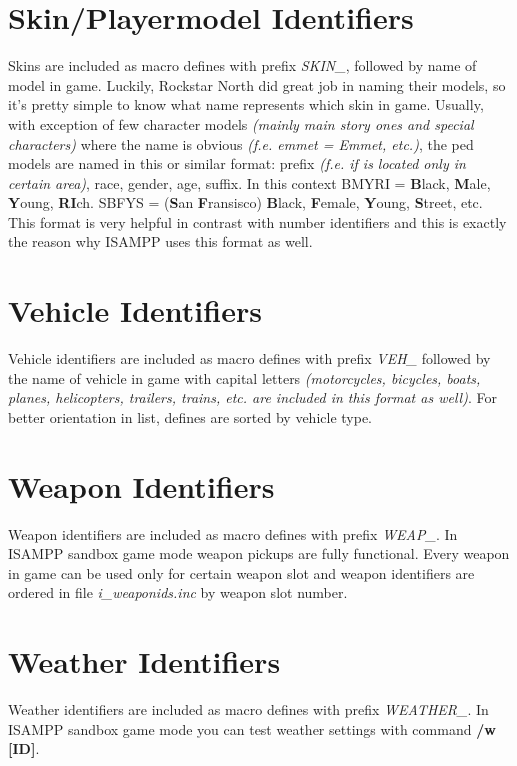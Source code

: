 \documentclass{article}
\begin{document}
\section{Skin/Playermodel Identifiers}
Skins are included as macro defines with prefix \textit{SKIN\_}, followed by name of model in game. Luckily, Rockstar North did great job in naming their models, so it's pretty simple to know what name represents which skin in game. Usually, with exception of few character models \textit{(mainly main story ones and special characters)} where the name is obvious \textit{(f.e. emmet = Emmet, etc.)}, the ped models are named in this or similar format: prefix \textit{(f.e. if is located only in certain area)}, race, gender, age, suffix. In this context BMYRI = \textbf{B}lack, \textbf{M}ale, \textbf{Y}oung, \textbf{RI}ch. SBFYS = (\textbf{S}an \textbf{F}ransisco) \textbf{B}lack, \textbf{F}emale, \textbf{Y}oung, \textbf{S}treet, etc. This format is very helpful in contrast with number identifiers and this is exactly the reason why ISAMPP uses this format as well.

\section{Vehicle Identifiers}
Vehicle identifiers are included as macro defines with prefix \textit{VEH\_} followed by the name of vehicle in game with capital letters \textit{(motorcycles, bicycles, boats, planes, helicopters, trailers, trains, etc. are included in this format as well)}. For better orientation in list, defines are sorted by vehicle type.

\section{Weapon Identifiers}
Weapon identifiers are included as macro defines with prefix \textit{WEAP\_}. In ISAMPP sandbox game mode weapon pickups are fully functional. Every weapon in game can be used only for certain weapon slot and weapon identifiers are ordered in file \textit{i\_weaponids.inc} by weapon slot number.

\section{Weather Identifiers}
Weather identifiers are included as macro defines with prefix \textit{WEATHER\_}. In ISAMPP sandbox game mode you can test weather settings with command \textbf{/w [ID]}.
\end{document}
